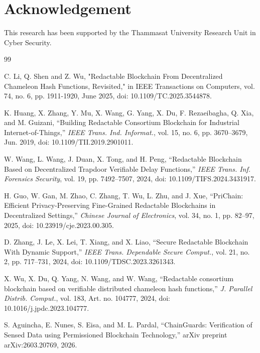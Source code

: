\documentclass[lettersize,journal]{IEEEtran}
\begin{document}
    \section{Acknowledgement}
    This research has been supported by the Thammasat University Research Unit in Cyber Security.
    
     \begin{thebibliography}{99}
    
    C. Li, Q. Shen and Z. Wu, "Redactable Blockchain From Decentralized Chameleon Hash Functions, Revisited," in IEEE Transactions on Computers, vol. 74, no. 6, pp. 1911-1920, June 2025, doi: 10.1109/TC.2025.3544878.
    
    
    
    
    K. Huang, X. Zhang, Y. Mu, X. Wang, G. Yang, X. Du, F. Rezaeibagha, Q. Xia, and M. Guizani,
    ``Building Redactable Consortium Blockchain for Industrial Internet-of-Things,''
    \textit{IEEE Trans. Ind. Informat.}, vol. 15, no. 6, pp. 3670--3679, Jun. 2019,
    doi: 10.1109/TII.2019.2901011.
    
    W. Wang, L. Wang, J. Duan, X. Tong, and H. Peng,
    ``Redactable Blockchain Based on Decentralized Trapdoor Verifiable Delay Functions,''
    \textit{IEEE Trans. Inf. Forensics Security}, vol. 19, pp. 7492--7507, 2024,
    doi: 10.1109/TIFS.2024.3431917.
    
    H. Guo, W. Gan, M. Zhao, C. Zhang, T. Wu, L. Zhu, and J. Xue,
    ``PriChain: Efficient Privacy-Preserving Fine-Grained Redactable Blockchains in Decentralized Settings,''
    \textit{Chinese Journal of Electronics}, vol. 34, no. 1, pp. 82--97, 2025,
    doi: 10.23919/cje.2023.00.305.
    
    D. Zhang, J. Le, X. Lei, T. Xiang, and X. Liao,
    ``Secure Redactable Blockchain With Dynamic Support,''
    \textit{IEEE Trans. Dependable Secure Comput.}, vol. 21, no. 2, pp. 717--731, 2024,
    doi: 10.1109/TDSC.2023.3261343.
    
    X. Wu, X. Du, Q. Yang, N. Wang, and W. Wang,
    ``Redactable consortium blockchain based on verifiable distributed chameleon hash functions,''
    \textit{J. Parallel Distrib. Comput.}, vol. 183, Art. no. 104777, 2024,
    doi: 10.1016/j.jpdc.2023.104777.
    
    S. Aguincha, E. Nunes, S. Eisa, and M. L. Pardal,
    ``ChainGuards: Verification of Sensed Data using Permissioned Blockchain Technology,''
    arXiv preprint arXiv:2603.20769, 2026.
    

\end{thebibliography}
\end{document}
